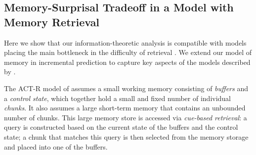 \documentclass[11pt,letterpaper]{article}
\begin{document}



\subsection{Memory-Surprisal Tradeoff in a Model with Memory Retrieval}\label{sec:retrieval}

Here we show that our information-theoretic analysis is compatible with models placing the main bottleneck in the difficulty of retrieval \citep{mcelree2000sentence,lewis-activation-based-2005,nicenboim2018models,vasishth2019computational}.
We extend our model of memory in incremental prediction to capture key aspects of the models described by \citet{lewis-activation-based-2005,nicenboim2018models,vasishth2019computational}.

The ACT-R model of \cite{lewis-activation-based-2005} assumes a small working memory consisting of \emph{buffers} and a \emph{control state}, which together hold a small and fixed number of individual \emph{chunks}.
It also assumes a large short-term memory that contains an unbounded number of chunks.
This large memory store is accessed via \emph{cue-based retrieval}: a query is constructed based on the current state of the buffers and the control state; a chunk that matches this query is then selected from the memory storage and placed into one of the buffers.
\end{document}
